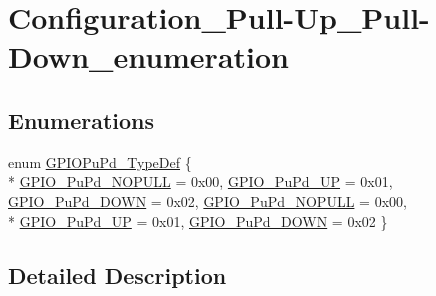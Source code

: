 \hypertarget{group___configuration___pull-_up___pull-_down__enumeration}{\section{Configuration\-\_\-\-Pull-\/\-Up\-\_\-\-Pull-\/\-Down\-\_\-enumeration}
\label{group___configuration___pull-_up___pull-_down__enumeration}
}
\subsection*{Enumerations}
\begin{DoxyCompactItemize}
\item 
enum \hyperlink{group___configuration___pull-_up___pull-_down__enumeration_gafb7ecd99c44b4fd702d669304a36c2c8}{G\-P\-I\-O\-Pu\-Pd\-\_\-\-Type\-Def} \{ \\*
\hyperlink{group___configuration___pull-_up___pull-_down__enumeration_gafb7ecd99c44b4fd702d669304a36c2c8a013a40bdeb6b3f43e02f8e4da896ba51}{G\-P\-I\-O\-\_\-\-Pu\-Pd\-\_\-\-N\-O\-P\-U\-L\-L} = 0x00, 
\hyperlink{group___configuration___pull-_up___pull-_down__enumeration_gafb7ecd99c44b4fd702d669304a36c2c8a474392f71830af3fcf2c4cc3896c9c8b}{G\-P\-I\-O\-\_\-\-Pu\-Pd\-\_\-\-U\-P} = 0x01, 
\hyperlink{group___configuration___pull-_up___pull-_down__enumeration_gafb7ecd99c44b4fd702d669304a36c2c8ab1e6c016575596c73327862984d8955c}{G\-P\-I\-O\-\_\-\-Pu\-Pd\-\_\-\-D\-O\-W\-N} = 0x02, 
\hyperlink{group___configuration___pull-_up___pull-_down__enumeration_gafb7ecd99c44b4fd702d669304a36c2c8a013a40bdeb6b3f43e02f8e4da896ba51}{G\-P\-I\-O\-\_\-\-Pu\-Pd\-\_\-\-N\-O\-P\-U\-L\-L} = 0x00, 
\\*
\hyperlink{group___configuration___pull-_up___pull-_down__enumeration_gafb7ecd99c44b4fd702d669304a36c2c8a474392f71830af3fcf2c4cc3896c9c8b}{G\-P\-I\-O\-\_\-\-Pu\-Pd\-\_\-\-U\-P} = 0x01, 
\hyperlink{group___configuration___pull-_up___pull-_down__enumeration_gafb7ecd99c44b4fd702d669304a36c2c8ab1e6c016575596c73327862984d8955c}{G\-P\-I\-O\-\_\-\-Pu\-Pd\-\_\-\-D\-O\-W\-N} = 0x02
 \}
\end{DoxyCompactItemize}


\subsection{Detailed Description}



